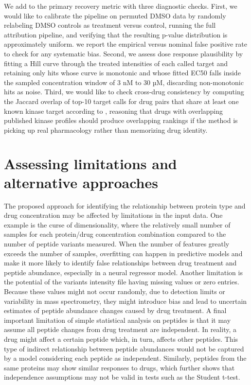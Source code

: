 We add to the primary recovery metric with three diagnostic checks. First, we would like to calibrate the pipeline on permuted DMSO data by randomly relabeling DMSO controls as treatment versus control, running the full attribution pipeline, and verifying that the resulting p-value distribution is approximately uniform.  we report the empirical versus nominal false positive rate to check for any systematic bias. Second, we assess dose response plausibility by fitting a Hill curve through the treated intensities of each called target and retaining only hits whose curve is monotonic and whose fitted EC50 falls inside the sampled concentration window of 3 nM to 30 µM, discarding non-monotonic hits as noise. Third, we would like to check cross-drug consistency by computing the Jaccard overlap of top-10 target calls for drug pairs that share at least one known kinase target according to \cite{klaeger2017target}, reasoning that drugs with overlapping published kinase profiles should produce overlapping rankings if the method is picking up real pharmacology rather than memorizing drug identity.



\section{Assessing limitations and alternative approaches}

The proposed approach for identifying the relationship between protein type and drug concentration may be affected by limitations in the input data. One example is the curse of dimensionality, where the relatively small number of samples for each protein/drug concentration combination compared to the number of peptide variants measured. When the number of features greatly exceeds the number of samples, overfitting can happen in predictive models and make it more likely to identify false relationships between drug treatment and peptide abundance, especially in a neural regressor model. Another limitation is the potential of the variants intensity file having missing values or zero entries. Because these values might not occur randomly, due to detection limits or variability in mass spectrometry, they might introduce bias and lead to uncertain estimates of peptide abundance changes caused by drug treatment. A final important limitation of simple statistical analysis on peptides is that it may assume all peptide changes from drug treatment are independent. In reality, a drug might affect a certain peptide which, in turn, affects other peptides. This type of indirect relationship between peptide abundances would not be captured by a model considering each peptide as independent. Similarly, peptides from the same proteins may show similar responses to drugs, which further shows that independence assumptions may not be valid in tests such as the Student t-test.

